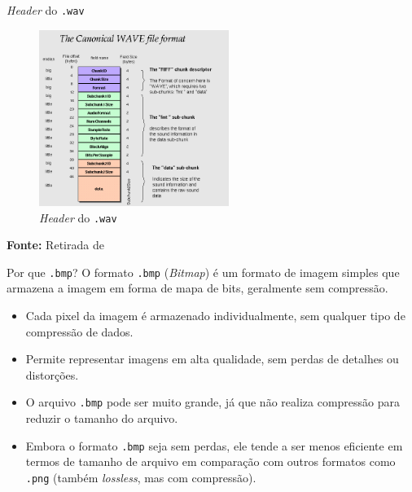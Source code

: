 \documentclass{beamer}
\begin{document}
    \begin{frame}{\textit{Header} do \texttt{.wav}}
        \begin{figure}
            \centering
            \caption{\textit{Header} do \texttt{.wav}} %
            \includegraphics[width=0.55\textwidth]{imagens/wav_header.png}
        \end{figure}
        \vspace{2mm} %
        \centering
        \textbf{Fonte:} Retirada de \textcolor{blue}{~\cite{sappwavheader}}%
    \end{frame}

    \begin{frame}{Por que \texttt{.bmp}?}
        O formato \texttt{.bmp} (\textit{Bitmap}) é um formato de imagem simples que armazena a imagem em forma de mapa de bits, geralmente sem compressão. 

        \begin{itemize}
            \item Cada pixel da imagem é armazenado individualmente, sem qualquer tipo de compressão de dados.
            \item Permite representar imagens em alta qualidade, sem perdas de detalhes ou distorções.
            \item O arquivo \texttt{.bmp} pode ser muito grande, já que não realiza compressão para reduzir o tamanho do arquivo.
            \item Embora o formato \texttt{.bmp} seja sem perdas, ele tende a ser menos eficiente em termos de tamanho de arquivo em comparação com outros formatos como \texttt{.png} (também \textit{lossless}, mas com compressão).
        \end{itemize}
    \end{frame}
\end{document}
